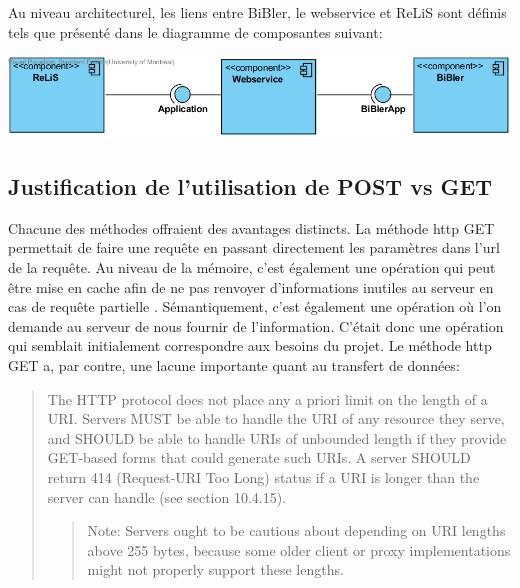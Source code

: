 \documentclass[a4paper,12pt,titlepage]{article}
\begin{document}
Au niveau architecturel, les liens entre BiBler, le webservice et ReLiS sont définis tels que présenté dans le diagramme de composantes suivant:

\includegraphics{ComponentDiagram.png}



\subsection{Justification de l'utilisation de POST vs GET}

Chacune des méthodes offraient des avantages distincts. La méthode http GET permettait de faire une requête en passant directement les paramètres dans l'url de la requête. Au niveau de la mémoire, c'est également une opération qui peut être mise en cache afin de ne pas renvoyer d'informations inutiles au serveur en cas de requête partielle \cite{w3b}. Sémantiquement, c'est également une opération où l'on demande au serveur de nous fournir de l'information. C'était donc une opération qui semblait initialement correspondre aux besoins du projet. Le méthode http GET a, par contre, une lacune importante quant au transfert de données:

\blockquote {The HTTP protocol does not place any a priori limit on the length of a URI. Servers MUST be able to handle the URI of any resource they serve, and SHOULD be able to handle URIs of unbounded length if they provide GET-based forms that could generate such URIs. A server SHOULD return 414 (Request-URI Too Long) status if a URI is longer than the server can handle (see section 10.4.15).

\blockquote{Note: Servers ought to be cautious about depending on URI lengths
      above 255 bytes, because some older client or proxy
      implementations might not properly support these lengths.}
      } \cite{w3c}
      
\end{document}
